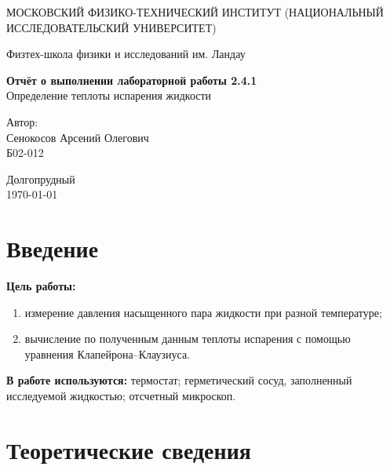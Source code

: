 \documentclass[a4paper,12pt]{article} %
\date{\today}
\begin{document}
\begin{titlepage}
	\begin{center}
		{\large МОСКОВСКИЙ ФИЗИКО-ТЕХНИЧЕСКИЙ ИНСТИТУТ (НАЦИОНАЛЬНЫЙ ИССЛЕДОВАТЕЛЬСКИЙ УНИВЕРСИТЕТ)}
	\end{center}
	\begin{center}
		{\large Физтех-школа физики и исследований им. Ландау}
	\end{center}
	
	
	\vspace{4.5cm}
	{\huge
		\begin{center}
			{\bf Отчёт о выполнении лабораторной работы 2.4.1}\\
			Определение теплоты испарения жидкости
		\end{center}
	}
	\vspace{2cm}
	\begin{flushright}
		{\LARGE Автор:\\ Сенокосов Арсений Олегович \\
			\vspace{0.2cm}
			Б02-012}
	\end{flushright}
	\vspace{8cm}
	\begin{center}
		Долгопрудный\\
		\today
	\end{center}
\end{titlepage}


\section{Введение}
\textbf{Цель работы:}  \begin{enumerate}
	\item измерение давления насыщенного пара жидкости при разной температуре;
	\item вычисление по полученным данным теплоты испарения с помощью уравнения Клапейрона–Клаузиуса.
\end{enumerate}

\textbf{В работе используются:} термостат; герметический сосуд, заполненный исследуемой жидкостью; отсчетный микроскоп.

\section{Теоретические сведения}
\end{document}

